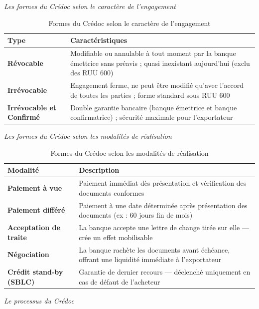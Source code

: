 \documentclass[12pt,a4paper]{report}
\begin{document}
\medskip\textit{Les formes du Crédoc selon le caractère de l'engagement}

\begin{table}[h!]
\centering
\begin{tabularx}{\textwidth}{>{\bfseries}l X}
\toprule
Type & Caractéristiques \\
\midrule
Révocable & Modifiable ou annulable à tout moment par la banque émettrice sans préavis ; quasi inexistant aujourd'hui (exclu des RUU 600) \\
\addlinespace
Irrévocable & Engagement ferme, ne peut être modifié qu'avec l'accord de toutes les parties ; forme standard sous RUU 600 \\
\addlinespace
Irrévocable et Confirmé & Double garantie bancaire (banque émettrice et banque confirmatrice) ; sécurité maximale pour l'exportateur \\
\bottomrule
\end{tabularx}
\caption{Formes du Crédoc selon le caractère de l'engagement}
\end{table}

\medskip\textit{Les formes du Crédoc selon les modalités de réalisation}

\begin{table}[h!]
\centering
\begin{tabularx}{\textwidth}{>{\bfseries}l X}
\toprule
Modalité & Description \\
\midrule
Paiement à vue & Paiement immédiat dès présentation et vérification des documents conformes \\
Paiement différé & Paiement à une date déterminée après présentation des documents (ex : 60 jours fin de mois) \\
Acceptation de traite & La banque accepte une lettre de change tirée sur elle --- crée un effet mobilisable \\
Négociation & La banque rachète les documents avant échéance, offrant une liquidité immédiate à l'exportateur \\
Crédit stand-by (SBLC) & Garantie de dernier recours --- déclenché uniquement en cas de défaut de l'acheteur \\
\bottomrule
\end{tabularx}
\caption{Formes du Crédoc selon les modalités de réalisation}
\end{table}

\medskip\textit{Le processus du Crédoc}
\end{document}

